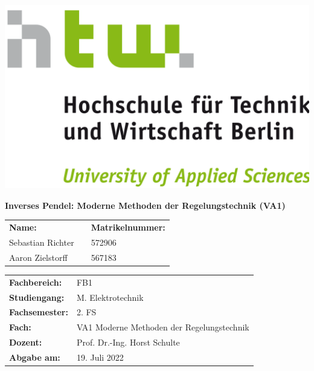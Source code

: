 \documentclass[
	pagesize,
	fontsize=12pt,
	paper=a4,
	oneside,
   reqno
]{scrartcl}
\begin{document}
\begin{titlepage}
   \pagestyle{empty} %

   \begin{flushright}
   \includegraphics[scale=.07]{Bilder/LogoHTWBerlin.png}  \nocite{HTWgross}
   \end{flushright}

   \vspace{1cm}

   \begin{center}
      \Huge{\textbf{Inverses Pendel: Moderne Methoden der Regelungstechnik (VA1)}} \\
   \end{center}

   \vspace{3cm}

   \begin{flushleft}
      \begin{tabular}{l c l }
         \textbf{Name: }&\hspace{1 cm} &\textbf{Matrikelnummer:} \\
         Sebastian Richter  & & 572906 \\
         Aaron Zielstorff   & & 567183 \\
      \end{tabular}
   \end{flushleft}

   \vspace{1cm}

   \begin{tabular}{l l}
      \textbf{Fachbereich:}   & FB1                                                 \\
      \textbf{Studiengang:}   & M.\xspace Elektrotechnik                            \\
      \textbf{Fachsemester:}  & 2.\xspace FS                                        \\
      \textbf{Fach:}          & VA1 Moderne Methoden der Regelungstechnik           \\
      \textbf{Dozent:}        & Prof.\xspace Dr.\xspace -Ing.\xspace Horst Schulte  \\
      \textbf{Abgabe am:}     & 19.\xspace Juli 2022                                \\ 
   \end{tabular}
\end{titlepage}
\end{document}

